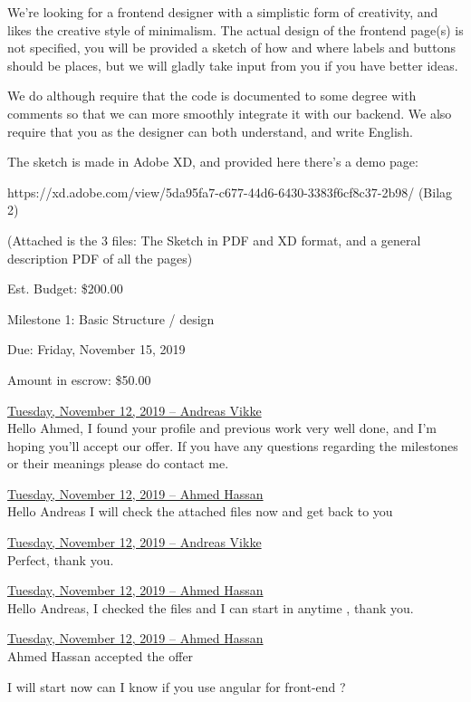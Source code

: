 \documentclass[11pt]{report}
\begin{document}
\noindent We're looking for a frontend designer with a simplistic form of creativity, and likes the creative style of minimalism. The actual design of the frontend page(s) is not specified, you will be provided a sketch of how and where labels and buttons should be places, but we will gladly take input from you if you have better ideas.

\noindent We do although require that the code is documented to some degree with comments so that we can more smoothly integrate it with our backend. We also require that you as the designer can both understand, and write English.

\noindent The sketch is made in Adobe XD, and provided here there's a demo page:

\noindent https://xd.adobe.com/view/5da95fa7-c677-44d6-6430-3383f6cf8c37-2b98/ (Bilag 2)

\noindent (Attached is the 3 files: The Sketch in PDF and XD format, and a general description PDF of all the pages)

Est. Budget: \$200.00

Milestone 1: Basic Structure / design

Due: Friday, November 15, 2019

Amount in escrow: \$50.00 

\noindent\underline{Tuesday, November 12, 2019 – Andreas Vikke}\\
\noindent Hello Ahmed, I found your profile and previous work very well done, and I'm hoping you'll accept our offer. If you have any questions regarding the milestones or their meanings please do contact me.

\noindent\underline{Tuesday, November 12, 2019 – Ahmed Hassan}\\
\noindent Hello Andreas I will check the attached files now and get back to you

\noindent\underline{Tuesday, November 12, 2019 – Andreas Vikke}\\
\noindent Perfect, thank you.


\noindent\underline{Tuesday, November 12, 2019 – Ahmed Hassan}\\
\noindent Hello Andreas, I checked the files and I can start in anytime , thank you.

\noindent\underline{Tuesday, November 12, 2019 – Ahmed Hassan}\\
\noindent Ahmed Hassan accepted the offer

\noindent I will start now can I know if you use angular for front-end ?
\end{document}
